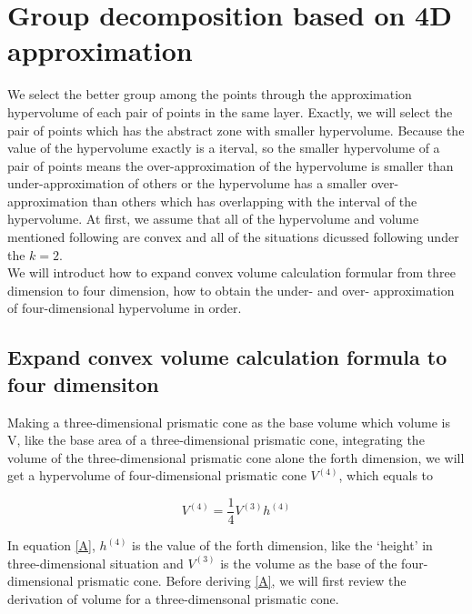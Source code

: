 \documentclass[runningheads]{llncs}
\begin{document}

\section{Group decomposition based on 4D approximation}\label{Sec3}
We select the better group among the points through the approximation hypervolume of each pair of points in the same layer. Exactly, we will select the pair of points which has the abstract zone with smaller hypervolume. Because the value of the hypervolume exactly is a iterval, so the smaller hypervolume of a pair of points means the over-approximation of the hypervolume is smaller than under-approximation of others or the hypervolume has a smaller over-approximation than others which has overlapping with the interval of the hypervolume. At first, we assume that all of the hypervolume and volume mentioned following are convex and all of the situations dicussed following under the $k=2$.
\\We will introduct how to expand convex volume calculation formular from three dimension to four dimension, how to obtain the under- and over- approximation of four-dimensional hypervolume in order.

\subsection{Expand convex volume calculation formula to four dimensiton}

\begin{theorem}\label{T1}
Making a three-dimensional prismatic cone as the base volume which volume is V, like the base area of a three-dimensional prismatic cone, integrating the volume of the three-dimensional prismatic cone alone the forth dimension, we will get a hypervolume of four-dimensional prismatic cone $V^{(4)}$, which equals to

\begin{equation}\label{A}
V^{(4)}=\frac{1}{4}V^{(3)}h^{(4)}
\end{equation} 

In equation \ref{A}, $h^{(4)}$ is the value of the forth dimension, like the ‘height’ in three-dimensional situation and $V^{(3)}$ is the volume as the base of the four-dimensional prismatic cone. Before deriving \ref{A}, we will first review the derivation of volume for a three-dimensonal prismatic cone.
\end{theorem}
\end{document}

